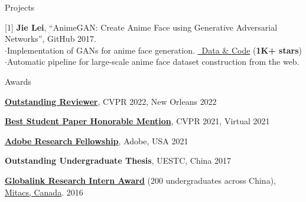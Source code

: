\documentclass{resume} %
\begin{document}
\begin{rSection}{Projects}
    \item {[1] \textbf{Jie Lei},
                ``AnimeGAN: Create Anime Face using Generative Adversarial Networks'',
                GitHub 2017.
                \\ $\cdot$\quad Implementation of GANs for anime face generation. 
                \href{https://github.com/jayleicn/animeGAN}{\color{codelinkcolor}\faGithub~Data \& Code} (\textbf{1K+ stars})
                \\ $\cdot$\quad Automatic pipeline for large-scale anime face dataset construction from the web.}
\end{rSection}



\begin{rSection}{Awards}
\item {\textbf{\href{https://cvpr2022.thecvf.com/outstanding-reviewers}{Outstanding Reviewer}}, CVPR 2022, New Orleans } \hfill {2022}        
\item {\textbf{\href{http://cvpr2021.thecvf.com/node/329}{Best Student Paper Honorable Mention}}, CVPR 2021, Virtual } \hfill {2021}    
\item {\textbf{\href{https://research.adobe.com/fellowship/}{Adobe Research Fellowship}}, Adobe, USA} \hfill {2021}    
\item {\textbf{Outstanding Undergraduate Thesis}, UESTC, China} \hfill {2017} 
\item {\textbf{\href{https://www.mitacs.ca/en/programs/globalink/globalink-research-internship}{Globalink Research Intern Award}} (200 undergraduates across China), \href{https://www.mitacs.ca/en}{Mitacs, Canada}. } \hfill {2016}
\end{rSection}


\newpage

\end{document}
